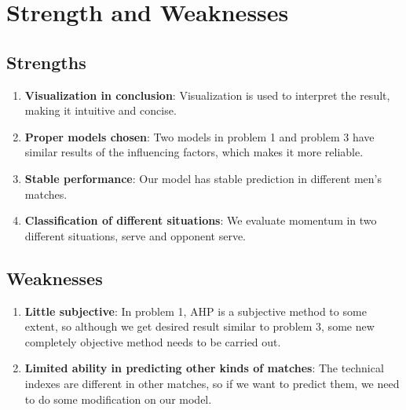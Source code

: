\section{Strength and Weaknesses}

\subsection{Strengths}

\begin{enumerate}
    \item {\bf Visualization in conclusion}: Visualization is used to interpret the result, making it intuitive and concise.
    \item {\bf Proper models chosen}: Two models in problem 1 and problem 3 have similar results of the influencing factors, which makes it more reliable.
    \item {\bf Stable performance}: Our model has stable prediction in different men's matches.
    \item {\bf Classification of different situations}: We evaluate momentum in two different situations, serve and opponent serve.
\end{enumerate}


\subsection{Weaknesses}

\begin{enumerate}
    \item {\bf Little subjective}: In problem 1, AHP is a subjective method to some extent, so although we get desired result similar to problem 3,
    some new completely objective method needs to be carried out.
    \item {\bf Limited ability in predicting other kinds of matches}: The technical indexes are different in other matches, so if we want to predict them, 
    we need to do some modification on our model.
\end{enumerate}